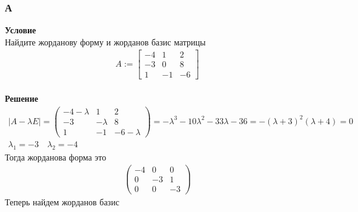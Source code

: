 		\subsubsection*{\textbf{А}}
		\textbf{Условие}\\
		 Найдите жорданову форму и жорданов базис матрицы
		 \begin{gather*}
			 A:=
			 \left[\begin{array}{ccc}
				 -4 & 1 & 2 \\
				 -3 & 0 & 8 \\
				 1 & -1 & -6
			 \end{array}\right]
		\end{gather*}
		\\
		\textbf{Решение}\\
		\begin{gather*}
			|A- \lambda E| = 
			\begin{pmatrix}
				-4-\lambda & 1 & 2\\
				-3 & -\lambda & 8\\
				1 & -1 & -6-\lambda
			\end{pmatrix}
			= -\lambda^3 - 10\lambda^2 - 33\lambda - 36 = -(\lambda + 3)^2(\lambda + 4) = 0\\
			\lambda_1 = -3\quad \lambda_2 = -4
		\end{gather*}
		Тогда жорданова форма это
		\begin{gather*}
			\begin{pmatrix}
				-4 & 0 & 0\\
				0 & -3 & 1\\
				0 & 0 & -3
			\end{pmatrix}
		\end{gather*}
		Теперь найдем жорданов базис
